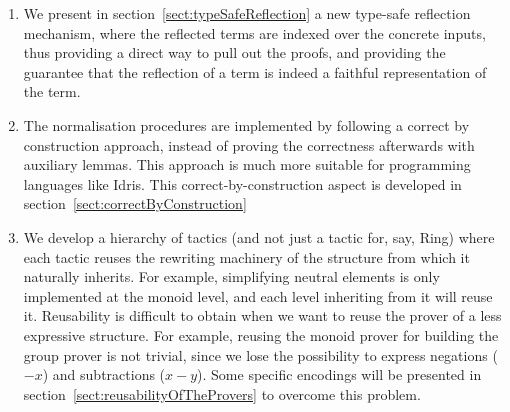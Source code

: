 \begin{enumerate}

\item We present in section~\ref{sect:typeSafeReflection} a new type-safe reflection mechanism, where the reflected terms are indexed over the concrete inputs, thus providing a direct way to pull out the proofs, and providing the guarantee that the reflection of a term is indeed a faithful representation of the term.

\item The normalisation procedures are implemented by following a correct by construction approach, instead of proving the correctness afterwards with auxiliary lemmas. This approach is much more suitable for programming languages like Idris. This correct-by-construction aspect is developed in section~\ref{sect:correctByConstruction}

\item We develop a hierarchy of tactics (and not just a tactic for, say, Ring) where each tactic reuses the rewriting machinery of the structure from which it naturally inherits.
For example, simplifying neutral elements is only implemented at the monoid level, and each level inheriting from it will reuse it. Reusability is difficult to obtain when we want to reuse the prover of a less expressive structure. For example, reusing the monoid prover for building the
group prover is not trivial, since we lose the possibility to express
negations ($-x$) and subtractions ($x-y$). Some specific encodings
will be presented in section~\ref{sect:reusabilityOfTheProvers} to overcome this problem.

\end{enumerate}


